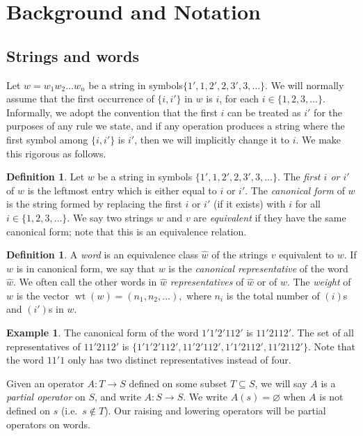 \documentclass[10pt]{amsart}
\theoremstyle{definition}
\newtheorem{defi}[theorem]{Definition}
\newtheorem{exam}[theorem]{Example}
\providecommand{\ie}{i.e.\ }
\DeclareMathOperator{\wt}{wt}
\begin{document}
\section{Background and Notation}\label{sec:notation}

\subsection{Strings and words}

Let $w = w_1w_2 \dots w_n$ be a string in symbols\break $\{1',1,2',2,3',3,\ldots\}$. We will normally assume that the first occurrence of $\{i,i'\}$ in $w$ is $i$, for each $i\in \{1,2,3,\ldots\}$. Informally, we adopt the convention that the first $i$ can be treated as $i'$ for the purposes of any rule we state, and if any operation produces a string where the first symbol among $\{i,i'\}$ is $i'$, then we will implicitly change it to $i$. We make this rigorous as follows.

\begin{defi}
Let $w$ be a string in symbols $\{1',1,2',2,3',3,\ldots\}$. The \emph{first $i$ or $i'$} of $w$ is the leftmost entry which is either equal to $i$ or $i'$. The \emph{canonical form} of $w$ is the string formed by replacing the first $i$ or $i'$ (if it exists) with $i$ for all $i\in \{1,2,3,\ldots\}$. We say two strings $w$ and $v$ are \emph{equivalent} if they have the same canonical form; note that this is an equivalence relation.
\end{defi}

\begin{defi}
A \emph{word} is an equivalence class $\hat{w}$ of the strings $v$ equivalent to $w$. If $w$ is in canonical form, we say that $w$ is the \emph{canonical representative} of the word $\hat{w}$. We often call the other words in $\hat{w}$ \emph{representatives} of $\hat{w}$ or of $w$. The \emph{weight} of $w$ is the vector $\wt (w) = (n_1, n_2, \ldots ),$ where $n_i$ is the total number of $(i)$s and $(i')$s in $w$.
\end{defi}

\begin{exam}
The canonical form of the word $1'1'2'112'$ is $11'2112'$. The set of all representatives of $11'2112'$ is $\{1'1'2'112',11'2'112',1'1'2112',11'2112'\}$. Note that the word $11'1$ only has two distinct representatives instead of four.
\end{exam}

Given an operator $A:T\to S$ defined on some subset $T\subseteq S$, we will say $A$ is a \emph{partial operator} on $S$, and write $A : S \to S$. We write $A(s)=\varnothing$ when $A$ is not defined on $s$ (\ie $s\not\in T$). Our raising and lowering operators will be partial operators on words.
\end{document}
